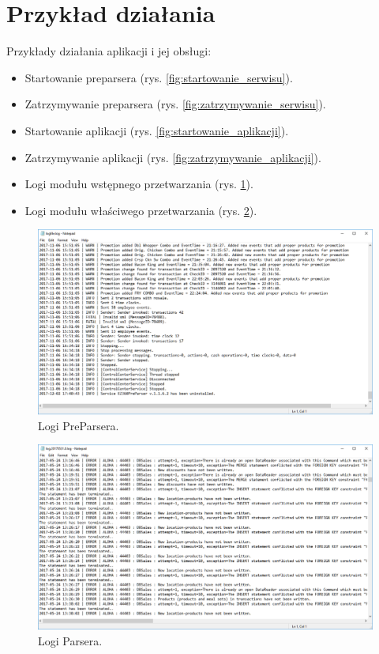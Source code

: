 \documentclass[a4paper]{book}
\begin{document}
\section{Przykład działania}
Przykłady działania aplikacji i jej obsługi:
 \begin{itemize}
	\item Startowanie preparsera (rys. \ref{fig:startowanie_serwisu}).
	\item Zatrzymywanie preparsera (rys. \ref{fig:zatrzymywanie_serwisu}).
	\item Startowanie aplikacji (rys. \ref{fig:startowanie_aplikacji}).
	\item Zatrzymywanie aplikacji (rys. \ref{fig:zatrzymywanie_aplikacji}).
	\item Logi modułu wstępnego przetwarzania (rys. \ref{fig:preparser_log}).
	\item Logi modułu właściwego przetwarzania (rys. \ref{fig:parser_log}).
\end{itemize}
\begin{figure}[t]
	\centering
	\includegraphics[width=\textwidth]{./img/preparser_log.png}
	\caption{Logi PreParsera.}
	\label{fig:preparser_log}
\end{figure}
\begin{figure}[t]
	\centering
	\includegraphics[width=\textwidth]{./img/parser_log.png}
	\caption{Logi Parsera.}
	\label{fig:parser_log}
\end{figure}
\end{document}
